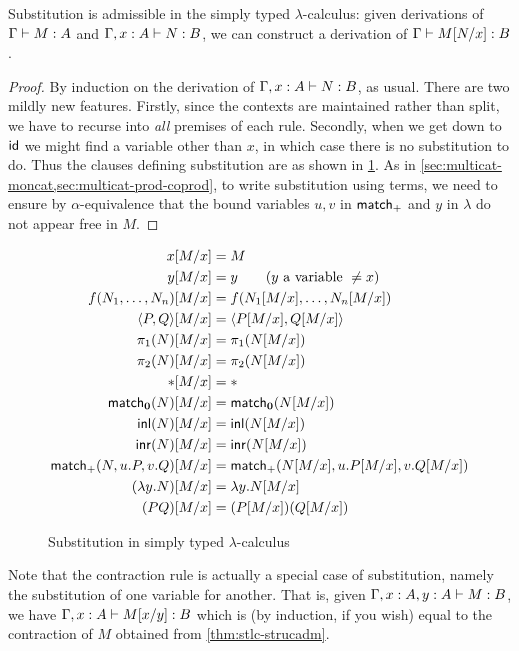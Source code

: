 \begin{lem}\label{thm:stlc-subadm}
  Substitution is admissible in the simply typed $\lambda$-calculus: given derivations of $\Gamma\vdash M:A$ and $\Gamma,x:A\vdash N:B$, we can construct a derivation of $\Gamma\vdash M[N/x]:B$.
\end{lem}
\begin{proof}
  By induction on the derivation of $\Gamma,x:A\vdash N:B$, as usual.
  There are two mildly new features.
  Firstly, since the contexts are maintained rather than split, we have to recurse into \emph{all} premises of each rule.
  Secondly, when we get down to $\mathsf{id}$ we might find a variable other than $x$, in which case there is no substitution to do.
  Thus the clauses defining substitution are as shown in \cref{fig:stlc-sub}.
  As in \cref{sec:multicat-moncat,sec:multicat-prod-coprod}, to write substitution using terms, we need to ensure by $\alpha$-equivalence that the bound variables $u,v$ in $\mathsf{match}_+$ and $y$ in $\lambda$ do not appear free in $M$.
\end{proof}

\begin{figure}
  \centering
  \begin{align*}
    x[M/x] &= M \\
    y[M/x] &= y \qquad (y\text{ a variable } \neq x)\\
    f(N_1,\dots,N_n)[M/x] &= f(N_1[M/x],\dots,N_n[M/x])\\
    \langle P,Q\rangle[M/x] &= \langle P[M/x],Q[M/x]\rangle\\
    \pi_1(N)[M/x] &= \pi_1(N[M/x])\\
    \pi_2(N)[M/x] &= \pi_2(N[M/x])\\
    \mathord{\ast}[M/x] &= \mathord{\ast}\\
    \mathsf{match}_{\mathbf{0}}(N)[M/x] &= \mathsf{match}_{\mathbf{0}}(N[M/x])\\
    \mathsf{inl}(N)[M/x] &= \mathsf{inl}(N[M/x])\\
    \mathsf{inr}(N)[M/x] &= \mathsf{inr}(N[M/x])\\
    \mathsf{match}_+(N,u.P,v.Q)[M/x] &= \mathsf{match}_+(N[M/x],u.P[M/x],v.Q[M/x])\\
    (\lambda y.N)[M/x] &= \lambda y.N[M/x]\\
    (PQ)[M/x] &= (P[M/x])(Q[M/x])
  \end{align*}
  \caption{Substitution in simply typed $\lambda$-calculus}
  \label{fig:stlc-sub}
\end{figure}

Note that the contraction rule is actually a special case of substitution, namely the substitution of one variable for another.
That is, given $\Gamma,x:A,y:A \vdash M:B$, we have $\Gamma,x:A \vdash M[x/y]:B$ which is (by induction, if you wish) equal to the contraction of $M$ obtained from \cref{thm:stlc-strucadm}.

